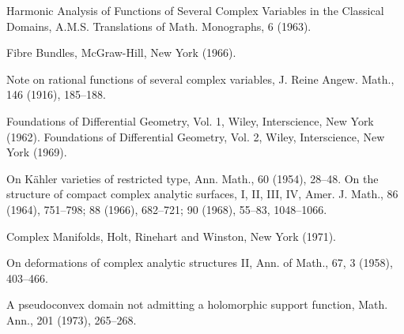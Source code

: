 \begin{sourcebibliography}
 Harmonic Analysis of Functions of Several Complex Variables in the Classical Domains, A.M.S. Translations of Math. Monographs, 6 (1963).
\end{sourcebibliography}
\begin{sourcebibliography}
 Fibre Bundles, McGraw-Hill, New York (1966).
\end{sourcebibliography}
\begin{sourcebibliography}
 Note on rational functions of several complex variables, J. Reine Angew. Math., 146 (1916), 185--188.
\end{sourcebibliography}
\begin{sourcebibliography}
 Foundations of Differential Geometry, Vol. 1, Wiley, Interscience, New York (1962).
 Foundations of Differential Geometry, Vol. 2, Wiley, Interscience, New York (1969).
\end{sourcebibliography}
\begin{sourcebibliography}
 On K\"ahler varieties of restricted type, Ann. Math., 60 (1954), 28--48.
 On the structure of compact complex analytic surfaces, I, II, III, IV, Amer. J. Math., 86 (1964), 751--798; 88 (1966), 682--721; 90 (1968), 55--83, 1048--1066.
\end{sourcebibliography}
\begin{sourcebibliography}
 Complex Manifolds, Holt, Rinehart and Winston, New York (1971).
\end{sourcebibliography}
\begin{sourcebibliography}
 On deformations of complex analytic structures II, Ann. of Math., 67, 3 (1958), 403--466.
\end{sourcebibliography}
\begin{sourcebibliography}
 A pseudoconvex domain not admitting a holomorphic support function, Math. Ann., 201 (1973), 265--268.
\end{sourcebibliography}
